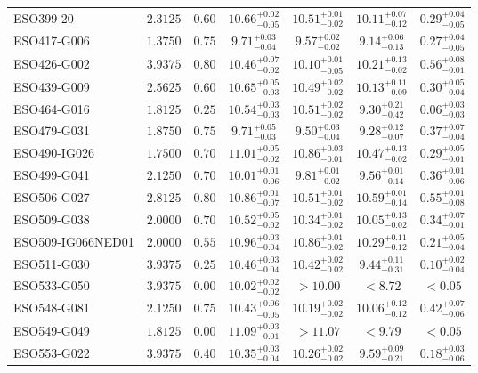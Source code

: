\documentclass[onecolumn]{mn2e}
\begin{document}
{\begin{center}
\begin{longtable}{lcccccc}
ESO399-20 & $2.3125$ & $0.60$ & $10.66_{-0.05}^{+0.02}$ & $10.51_{-0.02}^{+0.01}$ & $10.11_{-0.12}^{+0.07}$ &$0.29_{-0.05}^{+0.04}$ \\
ESO417-G006 & $1.3750$ & $0.75$ & $9.71_{-0.04}^{+0.03}$ & $9.57_{-0.02}^{+0.02}$ & $9.14_{-0.13}^{+0.06}$ &$0.27_{-0.05}^{+0.04}$ \\
ESO426-G002 & $3.9375$ & $0.80$ & $10.46_{-0.02}^{+0.07}$ & $10.10_{-0.05}^{+0.01}$ & $10.21_{-0.02}^{+0.13}$ &$0.56_{-0.01}^{+0.08}$ \\
ESO439-G009 & $2.5625$ & $0.60$ & $10.65_{-0.03}^{+0.05}$ & $10.49_{-0.02}^{+0.02}$ & $10.13_{-0.09}^{+0.11}$ &$0.30_{-0.04}^{+0.05}$ \\
ESO464-G016 & $1.8125$ & $0.25$ & $10.54_{-0.03}^{+0.03}$ & $10.51_{-0.02}^{+0.02}$ & $9.30_{-0.42}^{+0.21}$ &$0.06_{-0.03}^{+0.03}$ \\
ESO479-G031 & $1.8750$ & $0.75$ & $9.71_{-0.03}^{+0.05}$ & $9.50_{-0.04}^{+0.03}$ & $9.28_{-0.07}^{+0.12}$ &$0.37_{-0.04}^{+0.07}$ \\
ESO490-IG026 & $1.7500$ & $0.70$ & $11.01_{-0.02}^{+0.05}$ & $10.86_{-0.01}^{+0.03}$ & $10.47_{-0.02}^{+0.13}$ &$0.29_{-0.01}^{+0.05}$ \\
ESO499-G041 & $2.1250$ & $0.70$ & $10.01_{-0.06}^{+0.01}$ & $9.81_{-0.02}^{+0.01}$ & $9.56_{-0.14}^{+0.01}$ &$0.36_{-0.06}^{+0.01}$ \\
ESO506-G027 & $2.8125$ & $0.80$ & $10.86_{-0.07}^{+0.01}$ & $10.51_{-0.02}^{+0.01}$ & $10.59_{-0.14}^{+0.01}$ &$0.55_{-0.08}^{+0.01}$ \\
ESO509-G038 & $2.0000$ & $0.70$ & $10.52_{-0.02}^{+0.05}$ & $10.34_{-0.02}^{+0.01}$ & $10.05_{-0.02}^{+0.13}$ &$0.34_{-0.01}^{+0.07}$ \\
ESO509-IG066NED01 & $2.0000$ & $0.55$ & $10.96_{-0.04}^{+0.03}$ & $10.86_{-0.02}^{+0.01}$ & $10.29_{-0.12}^{+0.11}$ &$0.21_{-0.04}^{+0.05}$ \\
ESO511-G030 & $3.9375$ & $0.25$ & $10.46_{-0.04}^{+0.03}$ & $10.42_{-0.02}^{+0.02}$ & $9.44_{-0.31}^{+0.11}$ &$0.10_{-0.04}^{+0.02}$ \\
ESO533-G050 & $3.9375$ & $0.00$ & $10.02_{-0.02}^{+0.02}$ & $>10.00$ & $<8.72$ &$<0.05$ \\
ESO548-G081 & $2.1250$ & $0.75$ & $10.43_{-0.05}^{+0.06}$ & $10.19_{-0.02}^{+0.02}$ & $10.06_{-0.12}^{+0.12}$ &$0.42_{-0.06}^{+0.07}$ \\
ESO549-G049 & $1.8125$ & $0.00$ & $11.09_{-0.01}^{+0.03}$ & $>11.07$ & $<9.79$ &$<0.05$ \\
ESO553-G022 & $3.9375$ & $0.40$ & $10.35_{-0.04}^{+0.03}$ & $10.26_{-0.02}^{+0.02}$ & $9.59_{-0.21}^{+0.09}$ &$0.18_{-0.06}^{+0.03}$ \\

\end{longtable}
\end{center}}
\end{document}
